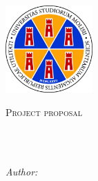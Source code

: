 \documentclass[
11pt, %
oneside, %
english, %
onehalfspacing,%
headsepline, %
]{MastersDoctoralThesis} %
\author{Federico \textsc{Zappone}} %
\begin{document}
\renewenvironment{abstract}


\pagestyle{plain} %


\begin{titlepage}
\begin{center}

\vspace*{.06\textheight}
{\scshape\LARGE \univname\par}\vspace{0.5cm} %
{\scshape\large \deptname\par}\vspace{1cm} %

\includegraphics[width=0.25\textwidth]{images/logo.png} %
\vspace{1cm}

\textsc{\Large Project proposal}\\[0.5cm] %

\HRule\\[0.4cm] %
{\huge \bfseries \ttitle\par}\vspace{0.4cm} %
\HRule\\[1.5cm] %

\begin{center} \large
\emph{Author:}\\
\href{mailto:f.zappone1@studenti.unimol.it}{\authorname} %
\end{center}


\end{center}
\end{titlepage}
\end{document}
